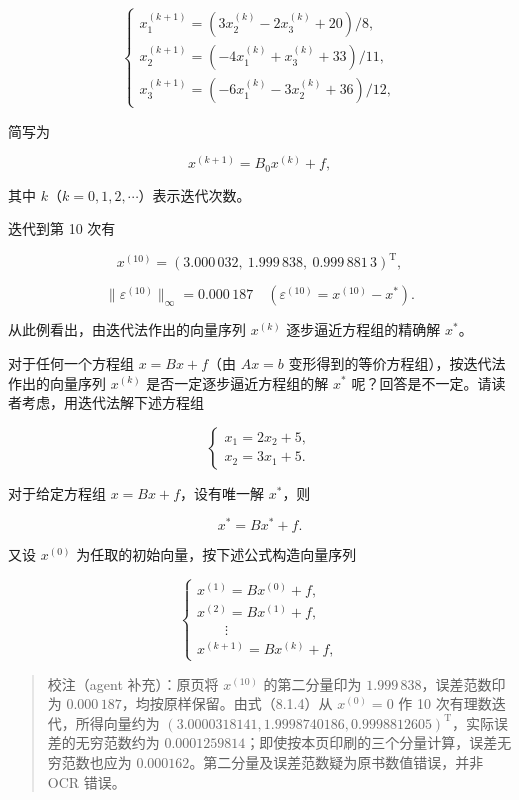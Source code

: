 \[
\begin{cases}
x_1^{(k+1)}=(3x_2^{(k)}-2x_3^{(k)}+20)/8,\\
x_2^{(k+1)}=(-4x_1^{(k)}+x_3^{(k)}+33)/11,\\
x_3^{(k+1)}=(-6x_1^{(k)}-3x_2^{(k)}+36)/12,
\end{cases}
\tag{8.1.4}
\]

简写为

\[
x^{(k+1)}=B_0x^{(k)}+f,
\]

其中 \(k\)（\(k=0,1,2,\cdots\)）表示迭代次数。

迭代到第 10 次有

\[
x^{(10)}=(3.000\,032,\ 1.999\,838,\ 0.999\,881\,3)^{\mathrm T},
\]

\[
\|\varepsilon^{(10)}\|_\infty=0.000\,187\quad(\varepsilon^{(10)}=x^{(10)}-x^*).
\]

从此例看出，由迭代法作出的向量序列 \(x^{(k)}\) 逐步逼近方程组的精确解 \(x^*\)。

对于任何一个方程组 \(x=Bx+f\)（由 \(Ax=b\) 变形得到的等价方程组），按迭代法作出的向量序列 \(x^{(k)}\) 是否一定逐步逼近方程组的解 \(x^*\) 呢？回答是不一定。请读者考虑，用迭代法解下述方程组

\[
\begin{cases}
x_1=2x_2+5,\\
x_2=3x_1+5.
\end{cases}
\]

对于给定方程组 \(x=Bx+f\)，设有唯一解 \(x^*\)，则

\[
x^*=Bx^*+f.
\tag{8.1.5}
\]

又设 \(x^{(0)}\) 为任取的初始向量，按下述公式构造向量序列

\[
\begin{cases}
x^{(1)}=Bx^{(0)}+f,\\
x^{(2)}=Bx^{(1)}+f,\\
\qquad\vdots\\
x^{(k+1)}=Bx^{(k)}+f,
\end{cases}
\tag{8.1.6}
\]

\begin{quote}
校注（agent 补充）：原页将 \(x^{(10)}\) 的第二分量印为 \(1.999\,838\)，误差范数印为 \(0.000\,187\)，均按原样保留。由式（8.1.4）从 \(x^{(0)}=0\) 作 10 次有理数迭代，所得向量约为 \((3.0000318141,1.9998740186,0.9998812605)^{\mathrm T}\)，实际误差的无穷范数约为 \(0.0001259814\)；即使按本页印刷的三个分量计算，误差无穷范数也应为 \(0.000162\)。第二分量及误差范数疑为原书数值错误，并非 OCR 错误。
\end{quote}

